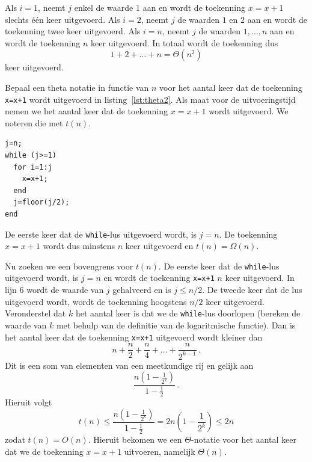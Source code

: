 Als $i=1$, neemt $j$ enkel de waarde $1$ aan en wordt de toekenning $x=x+1$ slechts één keer uitgevoerd. Als $i=2$, neemt $j$ de waarden $1$ en $2$ aan en wordt de toekenning twee keer uitgevoerd. Als $i=n$, neemt $j$ de waarden $1,\dots,n$ aan en wordt de toekenning $n$ keer uitgevoerd. In totaal wordt de toekenning dus
\[
1+2+\dots+n=\Theta(n^2)
\]
keer uitgevoerd.

\voorbeeld

Bepaal een theta notatie in functie van $n$ voor het aantal keer dat de toekenning \lstinline{x=x+1} wordt uitgevoerd in listing~\ref{lst:theta2}. Als maat voor de uitvoeringstijd nemen we het aantal keer dat de toekenning $x=x+1$ wordt uitgevoerd. We noteren die met  $t(n)$.
\begin{lstlisting}[caption={Bepaal een theta notatie}, label={lst:theta2}]
j=n;
while (j>=1)
  for i=1:j
    x=x+1;
  end
  j=floor(j/2);
end
\end{lstlisting}

De eerste keer dat de \lstinline{while}-lus uitgevoerd wordt, is $j=n$. De toekenning $x=x+1$ wordt dus minstens $n$ keer uitgevoerd en $t(n)=\Omega(n)$.

Nu zoeken we een bovengrens voor $t(n)$. De eerste keer dat de \lstinline{while}-lus uitgevoerd wordt, is $j=n$ en wordt de toekenning \lstinline{x=x+1} $n$ keer uitgevoerd. In lijn 6 wordt de waarde van $j$ gehalveerd en is $j\leq n/2$. De tweede keer dat de lus uitgevoerd wordt, wordt de toekenning hoogstens $n/2$ keer uitgevoerd. Veronderstel dat $k$ het aantal keer is dat we de \lstinline{while}-lus doorlopen (bereken de waarde van $k$ met behulp van de definitie van de logaritmische functie). Dan is het aantal keer dat de toekenning  \lstinline{x=x+1} uitgevoerd wordt kleiner dan
\[
n+\frac n2+\frac n4+\dots+\frac n{2^{k-1}}\,.
\]
Dit is een som van elementen van een meetkundige rij en gelijk aan
\[
\frac{n\left(1-\frac1{2^k}\right)}{1-\frac12}\,.
\]
Hieruit volgt
\[
t(n)\leq\frac{n\left(1-\frac1{2^k}\right)}{1-\frac12}=2n\left(1-\frac1{2^k}\right)\leq2n
\]
zodat $t(n)=O(n)$. Hieruit bekomen we een $\Theta$-notatie voor het aantal keer dat we de toekenning  $x=x+1$ uitvoeren, namelijk $\Theta(n)$.

